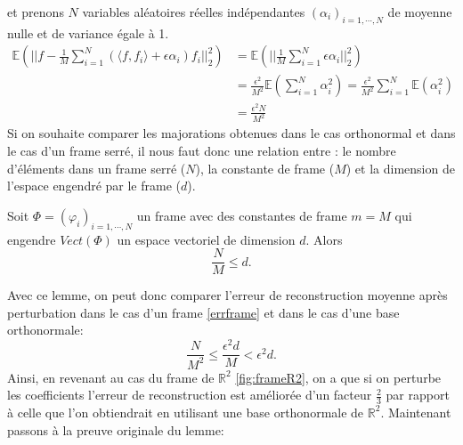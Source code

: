 et prenons $N$ variables aléatoires réelles indépendantes $(\alpha_i)_{i=1, \cdots, N}$  de moyenne nulle et de variance égale à 1.
\begin{align}
	\mathbb{E}\left(|| f- \frac{1}{M}\sum_{i=1}^N (\langle f, f_i\rangle + \epsilon \alpha_i)f_i||_2^2\right) &= \mathbb{E}\left(||\frac{1}{M} \sum_{i=1}^N \epsilon \alpha_i||_2^2\right)\nonumber\\
	&= \frac{\epsilon^2}{M^2} \mathbb{E}(\sum_{i=1}^N \alpha_i^2) = \frac{\epsilon^2}{M^2} \sum_{i=1}^N \mathbb{E}(\alpha_i^2) \nonumber\\
	&= \frac{\epsilon^2 N}{M^2} \label{errframe}%
\end{align}
Si on souhaite comparer les majorations obtenues dans le cas orthonormal et dans le cas d'un frame serré, il nous faut donc une relation entre : le nombre d'éléments dans un frame serré ($N$), la constante de frame ($M$) et la dimension de l'espace engendré par le frame ($d$).
\begin{lemme}\label{th:dimFrame}
	Soit $\Phi =(\varphi_i)_{i=1, \cdots, N}$ un frame avec des constantes de frame $m=M$ qui engendre $Vect(\Phi)$ un espace vectoriel de dimension $d$.
	Alors
	\begin{equation}
		\frac{N}{M} \leq d.
	\end{equation}
\end{lemme}
Avec ce lemme, on peut donc comparer l'erreur de reconstruction moyenne après perturbation dans le cas d'un frame \ref{errframe} et dans le cas d'une base orthonormale:
\begin{equation}
	\frac{N}{M^2} \leq \frac{\epsilon^2d}{M} < \epsilon^2 d.
\end{equation}
Ainsi, en revenant au cas du frame de $\mathbb{R}^2$ \ref{fig:frameR2}, on a que si on perturbe les coefficients l'erreur de reconstruction est améliorée d'un facteur $\frac{2}{3}$ par rapport à celle que l'on obtiendrait en utilisant une base orthonormale de $\mathbb{R}^2$.
Maintenant passons à la preuve originale du lemme:
